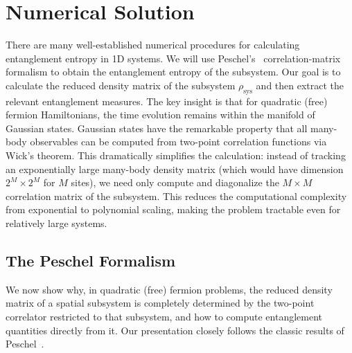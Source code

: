 \documentclass[12pt,oneside,openright]{report}
\theoremstyle{definition}
\theoremstyle{plain}
\theoremstyle{remark}
\begin{document}
\section{Numerical Solution}
There are many well-established numerical procedures for calculating entanglement entropy in 1D systems. We will use
Peschel's~\cite{Peschel_2003} correlation-matrix formalism to obtain the entanglement entropy of the subsystem.
Our goal is to calculate the reduced density matrix of the subsystem $\rho_{\mathrm{sys}}$ and then extract the relevant entanglement measures.
The key insight is that for quadratic (free) fermion Hamiltonians, the time evolution remains within the manifold of Gaussian states. 
Gaussian states have the remarkable property that all many-body observables can be computed from two-point correlation functions via 
Wick's theorem. This dramatically simplifies the calculation: instead of tracking an exponentially large many-body density matrix 
(which would have dimension $2^M \times 2^M$ for $M$ sites), we need only compute and diagonalize the $M \times M$ correlation matrix 
of the subsystem. This reduces the computational complexity from exponential to polynomial scaling, making the problem tractable even 
for relatively large systems.

\subsection{The Peschel Formalism}
\label{sec:peschel_formalism}
We now show why, in quadratic (free) fermion problems, the reduced density matrix of a spatial subsystem is 
completely determined by the two-point correlator restricted to that subsystem, and how to compute entanglement quantities directly from it. 
Our presentation closely follows the classic results of Peschel~\cite{Peschel_2003}.
\end{document}

